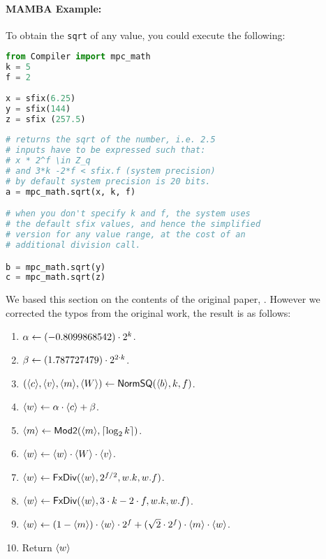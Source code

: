 \paragraph{MAMBA Example:} To obtain the \verb|sqrt| of any value, you could execute the following:
\begin{lstlisting}[language={python}]
from Compiler import mpc_math
k = 5
f = 2
 
x = sfix(6.25)
y = sfix(144)
z = sfix (257.5)
 
# returns the sqrt of the number, i.e. 2.5
# inputs have to be expressed such that:
# x * 2^f \in Z_q
# and 3*k -2*f < sfix.f (system precision)
# by default system precision is 20 bits. 
a = mpc_math.sqrt(x, k, f)

# when you don't specify k and f, the system uses
# the default sfix values, and hence the simplified
# version for any value range, at the cost of an
# additional division call.

b = mpc_math.sqrt(y)
c = mpc_math.sqrt(z)

\end{lstlisting}

We based this section on the contents of the original paper, \cite{Liedel12}.
However we corrected the typos from the original work, the result is as follows:
\begin{enumerate}
\item $\alpha \leftarrow (-0.8099868542) \cdot 2^k$.  
\item $\beta \leftarrow (1.787727479) \cdot 2^{2\cdot k}$.
\item $(\langle c \rangle,\langle v \rangle,\langle m \rangle,\langle W \rangle) \leftarrow \mathsf{NormSQ}(\langle b \rangle,k,f)$.
\item $\langle w \rangle \leftarrow \alpha \cdot \langle c \rangle+\beta$.
\item $\langle m \rangle \leftarrow \mathsf{Mod2}(\langle m \rangle,{\lceil \log_2 k \rceil})$.
\item $\langle w \rangle \leftarrow \langle w \rangle \cdot \langle W \rangle \cdot \langle v \rangle$.
\item $\langle w \rangle \leftarrow \mathsf{FxDiv}(\langle w \rangle,2^{f/2},w.k,w.f)$.
\item $\langle w \rangle \leftarrow \mathsf{FxDiv}(\langle w \rangle,3 \cdot k - 2 \cdot f,w.k,w.f)$.
\item $\langle w \rangle \leftarrow (1-\langle m \rangle) \cdot \langle w \rangle \cdot 2^f
			+(\sqrt{2} \cdot 2^f) \cdot \langle m \rangle\cdot \langle w \rangle$.
\item Return $\langle w \rangle$ %
\end{enumerate}


